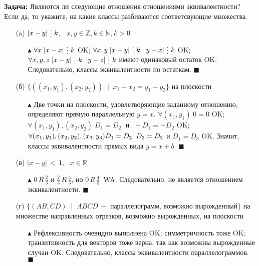 \textbf{Задача:} Являются ли следующие отношения отношениями эквивалентности? Если да, то укажите, на какие классы разбиваются соответсвующие множества.
\begin{enumerate}
    \item[(a)] $|x-y| \, \svdots \, k$, \, $x,y \in \mathbb{Z}, k \in \mathbb{N}, k > 0$
    \begin{itemize}
        \item[$\blacktriangle$] $\forall x \;|x-x| \, \svdots \, k$ {\color{ForestGreen}OK}; \quad $\forall x,y \;|x-y| \, \svdots \, k \;\; |y-x| \, \svdots \, k$ {\color{ForestGreen}OK}; \quad $\forall x,y,z \;|x-y| \, \svdots \, k \;\; |y-z| \, \svdots \, k$ имеют одинаковый остаток {\color{ForestGreen}OK}. Следовательно, классы эквивалентности по остаткам. $\blacksquare$
    \end{itemize}
    
    \item[(б)] $\{ ((x_1, y_1), (x_2,y_2)) \;\; | \;\; x_1-x_2 = y_1-y_2 \}$ на плоскости
    \begin{itemize}
        \item[$\blacktriangle$] Две точки на плоскости, удовлетворяющие заданному отношению, определяют прямую параллельную $y=x$. $\forall (x_1, y_1) \;0 = 0$ {\color{ForestGreen}OK}; \quad $\forall (x_1, y_1), (x_2,y_2) \; D_1 = D_2 \;$ и $\; -D_1=-D_2$ {\color{ForestGreen}OK}; \quad $\forall (x_1, y_1), (x_2,y_2), (x_3,y_3) \newline D_1=D_2 \;\; D_2=D_3$ и $D_1=D_3$ {\color{ForestGreen}OK}. Значит, классы эквивалентности прямых вида $y = x + b$. $\blacksquare$
    \end{itemize}
    
    \item[(в)] $|x-y| \, < \, 1$, \, $x \in \mathbb{R}$
    \begin{itemize}
        \item[$\blacktriangle$] $0 \, R \, \frac{2}{3}$ и $\frac{2}{3} \, R \, \frac{4}{3}$, но $0 \, R \, \frac{4}{3} \,$ {\color{Red}WA}. Следовательно, не является отношением эквивалентности. $\blacksquare$
    \end{itemize}
    
    \item[(г)] $\{ (AB, CD) \;\; | \;\; ABCD \, - $ параллелограмм, возможно вырожденный$\}$  на множестве направленных отрезков, возможно вырожденных, на плоскости
    \begin{itemize}
        \item[$\blacktriangle$] Рефлексивность очевидно выполнена {\color{ForestGreen}OK}; симметричность тоже {\color{ForestGreen}OK}; транзитивность для векторов тоже верна, так как возможны вырожденные случаи {\color{ForestGreen}OK}. Следовательно, классы эквивалентности параллелограммов. $\blacksquare$
    \end{itemize}


\end{enumerate}
